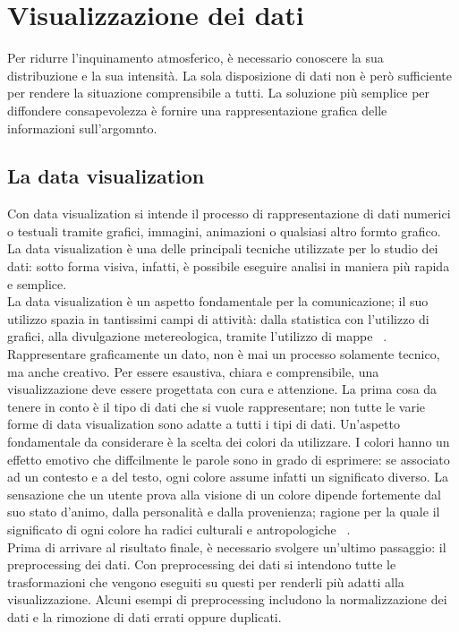 \section{Visualizzazione dei dati}
Per ridurre l'inquinamento atmosferico, è necessario conoscere la sua distribuzione e la sua intensità.
La sola disposizione di dati non è però sufficiente per rendere la situazione comprensibile a tutti.
La soluzione più semplice per diffondere consapevolezza è fornire una rappresentazione grafica delle informazioni sull'argomnto.
\subsection{La data visualization}
Con data visualization si intende il processo di rappresentazione di dati numerici o testuali tramite grafici, immagini, animazioni o qualsiasi altro formto grafico.
La data visualization è una delle principali tecniche utilizzate per lo studio dei dati: sotto forma visiva, infatti, è possibile eseguire analisi in maniera più rapida e semplice.
\\
La data visualization è un aspetto fondamentale per la comunicazione; il suo utilizzo spazia in tantissimi campi di attività:
dalla statistica con l'utilizzo di grafici, alla divulgazione metereologica, tramite l'utilizzo di mappe ~\cite{data_visualization}.
Rappresentare graficamente un dato, non è mai un processo solamente tecnico, ma anche creativo.
Per essere esaustiva, chiara e comprensibile, una visualizzazione deve essere progettata con cura e attenzione. La prima cosa da tenere in conto è il tipo di dati che si vuole rappresentare; non tutte le varie forme di data visualization sono adatte a tutti i tipi di dati.
Un'aspetto fondamentale da considerare è la scelta dei colori da utilizzare.
I colori hanno un effetto emotivo che diffcilmente le parole sono in grado di esprimere: se associato ad un contesto e a del testo, ogni colore assume infatti un significato diverso.
La sensazione che un utente prova alla visione di un colore dipende fortemente dal suo stato d'animo, dalla personalità e dalla provenienza; ragione per la quale il significato di ogni colore ha radici culturali e antropologiche ~\cite{color_symbolism}.
\\
Prima di arrivare al risultato finale, è necessario svolgere un'ultimo passaggio: il preprocessing dei dati.
Con preprocessing dei dati si intendono tutte le trasformazioni che vengono eseguiti su questi per renderli più adatti alla visualizzazione.
Alcuni esempi di preprocessing includono  la normalizzazione dei dati e la rimozione di dati errati oppure duplicati.

